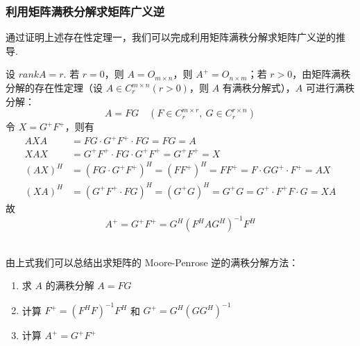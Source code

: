         \subsubsection{利用矩阵满秩分解求矩阵广义逆}
            \par 通过证明上述存在性定理一，我们可以完成利用矩阵满秩分解求矩阵广义逆的推导.
            \par 设 $rankA = r$. 若 $r = 0$，则 $A = O_{m \times n}$，则 $A^{+} = O_{n \times m}$；若 $r > 0$，由矩阵满秩分解的存在性定理（设 $A \in C_r^{m \times n}(r > 0)$，则 $A$ 有满秩分解式），$A$ 可进行满秩分解：
            \begin{equation*}
                A = FG \quad (F \in C_r^{m \times r}, \ G \in C_r^{r \times n})
            \end{equation*}
            令 $X = G^{+}F^{+}$，则有 
            \begin{align*}
                AXA &= FG \cdot G^{+}F^{+} \cdot FG = FG = A \\ XAX &= G^{+}F^{+} \cdot FG \cdot G^{+}F^{+} = G^{+}F^{+} = X \\ (AX)^H &= (FG \cdot G^{+}F^{+})^H = (FF^{+})^H = FF^{+} = F \cdot GG^{+} \cdot F^{+} = AX \\ (XA)^H &= (G^{+}F^{+} \cdot FG)^H = (G^{+}G)^H = G^{+}G = G^{+} \cdot F^{+}F \cdot G = XA
            \end{align*}
            故
            \begin{equation*}
                A^{+} = G^{+}F^{+} = G^H(F^HAG^H)^{-1}F^H
            \end{equation*}
            \\
            \par 由上式我们可以总结出求矩阵的 Moore-Penrose 逆的满秩分解方法：
            \begin{enumerate}
                \item 求 $A$ 的满秩分解 $A = FG$
                \item 计算 $F^{+} = (F^HF)^{-1}F^H$ 和 $G^{+} = G^H(GG^H)^{-1}$
                \item 计算 $A^{+} = G^{+}F^{+}$
            \end{enumerate}

